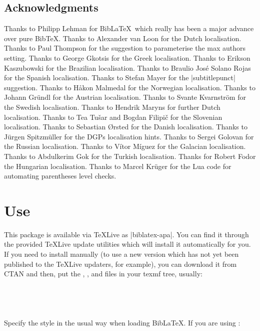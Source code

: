 \documentclass{ltxdockit}
\begin{document}
\subsection{Acknowledgments}

Thanks to Philipp Lehman for Bib\LaTeX\ which really has been a major
advance over pure Bib\TeX. Thanks to Alexander van Loon for the Dutch
localisation. Thanks to Paul Thompson for the suggestion to
parameterise the max authors setting. Thanks to George Gkotsis for the
Greek localisation. Thanks to Erikson Kaszubowski for the Brazilian
localisation. Thanks to Braulio José Solano Rojas for the Spanish
localisation. Thanks to Stefan Mayer for the |subtitlepunct| suggestion.
Thanks to Håkon Malmedal for the Norwegian localisation. Thanks to
Johann Gründl for the Austrian localisation. Thanks to Svante Kvarnström
for the Swedish localisation. Thanks to Hendrik Maryns for further Dutch
localisation. Thanks to Tea Tušar and Bogdan Filipič for the Slovenian
localisation. Thanks to Sebastian Ørsted for the Danish localisation.
Thanks to Jürgen Spitzmüller for the DGPs localisation hints. Thanks to
Sergei Golovan for the Russian localisation. Thanks to Vítor Míguez for the
Galacian localisation. Thanks to Abdulkerim Gok for the Turkish
localisation. Thanks for Robert Fodor the Hungarian localisation. Thanks to
Marcel Krüger for the Lua code for automating parentheses level checks.

\section{Use}\label{ref:use}
\label{use}
This package is available via \TeX Live as |biblatex-apa|. You can find it
through the provided \TeX Live update utilities which will install it
automatically for you. If you need to install manually (to use a new
version which has not yet been published to the \TeX Live updaters, for
example), you can download it from CTAN and then, put the ,
, and  files in your texmf tree, usually:\\ 

\noindent{}\\
\\
\\
\\

\noindent Specify the style in the usual way when loading Bib\LaTeX. If you
are using :
\end{document}
